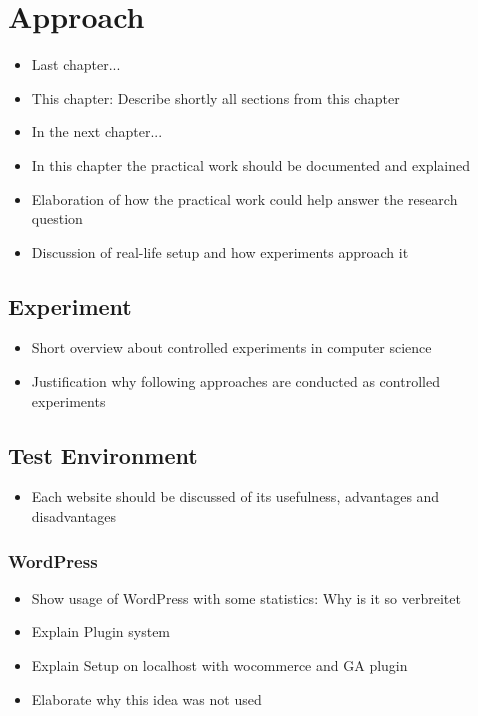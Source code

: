 \chapter{Approach}

\begin{itemize}
	\item Last chapter...
	\item This chapter: Describe shortly all sections from this chapter
	\item In the next chapter...
\end{itemize}

\begin{itemize}
\item In this chapter the practical work should be documented and explained
\item Elaboration of how the practical work could help answer the research question
\item Discussion of real-life setup and how experiments approach it
\end{itemize}

\section{Experiment}

\begin{itemize}
\item Short overview about controlled experiments in computer science
\item Justification why following approaches are conducted as controlled experiments
\end{itemize}



\section{Test Environment}


\begin{itemize}
    \item Each website should be discussed of its usefulness, advantages and disadvantages
\end{itemize}

\subsection{WordPress}

\begin{itemize}
    \item Show usage of WordPress with some statistics: Why is it so verbreitet
    \item Explain Plugin system
    \item Explain Setup on localhost with wocommerce and GA plugin
    \item Elaborate why this idea was not used
\end{itemize}

